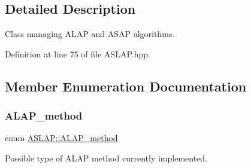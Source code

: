 \subsection{Detailed Description}
Class managing A\+L\+AP and A\+S\+AP algorithms. 

Definition at line 75 of file A\+S\+L\+A\+P.\+hpp.



\subsection{Member Enumeration Documentation}
\mbox{\label{classASLAP_a091a7ef2aa403de3cabf4275cd1eb211}} 
\subsubsection{\texorpdfstring{A\+L\+A\+P\+\_\+method}{ALAP\_method}}
{\footnotesize\ttfamily enum \hyperlink{classASLAP_a091a7ef2aa403de3cabf4275cd1eb211}{A\+S\+L\+A\+P\+::\+A\+L\+A\+P\+\_\+method}}



Possible type of A\+L\+AP method currently implemented. 


